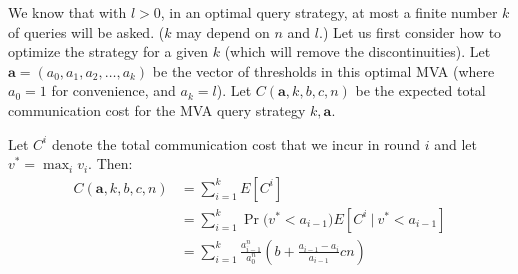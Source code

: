 




We know that with $l>0$, in an optimal query strategy, at most a finite
number $k$ of queries will be asked.  ($k$ may depend on $n$ and $l$.)  Let
us first consider how to optimize the strategy for a given $k$ (which will
remove the discontinuities).
Let $\boldsymbol a = (a_0, a_1, a_2, \ldots, a_k)$ be the vector of
thresholds in this optimal MVA (where $a_0 = 1$ for convenience, and $a_k =
l$).
Let $C(\boldsymbol a, k, b, c,
n)$ be the expected total communication cost 
for the MVA query strategy
$k, \boldsymbol a$.

Let $C^i$ denote the total communication cost that we incur in
round $i$ and let 
$v^* = \max_i v_i$. Then:
\begin{align}
C(\boldsymbol a, k, b, c, n) &= \sum_{i=1}^k E[ C^i ] \nonumber \\
  &= \sum_{i=1}^{k} \Pr\big( v^* < a_{i-1} \big) E[C^i ~|~ v^* < a_{i-1}] \nonumber \\
  &= \sum_{i=1}^{k} \frac{a_{i-1}^n}{a_0^n} \left( b + \frac{a_{i-1}-a_{i}}{a_{i-1}} cn \right)
  \label{eq:C_general_simplified}
\end{align}

